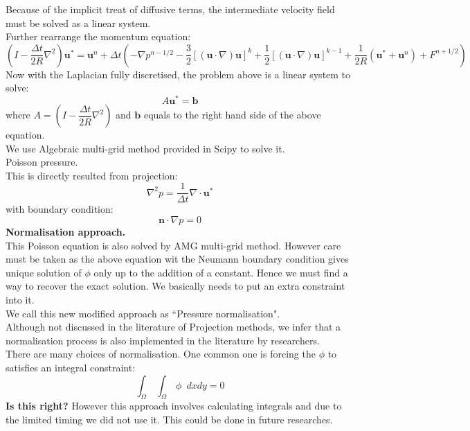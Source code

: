 Because of the implicit treat of diffusive terms, the intermediate velocity field must be solved as a linear system.\\
Further rearrange the momentum equation:
\begin{equation}
\left(I - \dfrac{\Delta t}{2R}\nabla^2\right)\textbf{u}^* = \textbf{u}^n + \Delta t\left(-\nabla p^{n-1/2} -\dfrac{3}{2}\left[(\textbf{u}\cdot\nabla)\textbf{u}\right]^k + \dfrac{1}{2}\left[(\textbf{u}\cdot\nabla)\textbf{u}\right]^{k-1} + \dfrac{1}{2R}(\textbf{u}^*+\textbf{u}^n) + F^{n+1/2} \right)
\end{equation}
Now with the Laplacian fully discretised, the problem above is a linear system to solve:
\begin{equation}
A\textbf{u}^* = \textbf{b}
\end{equation}
where $A = \left(I - \dfrac{\Delta t}{2R}\nabla^2\right)$ and $\textbf{b}$ equals to the right hand side of the above equation.\\

We use Algebraic multi-grid method provided in Scipy to solve it.\\

Poisson pressure.\\
This is directly resulted from projection:
\begin{equation}
\nabla^2 p = \dfrac{1}{\Delta t}\nabla \cdot \textbf{u}^*
\end{equation}
with boundary condition:
\begin{equation}
\textbf{n} \cdot \nabla p = 0
\end{equation}
\textbf{Normalisation approach.}\\
This Poisson equation is also solved by AMG multi-grid method. However care must be taken as the above equation wit the Neumann boundary condition gives unique solution of $\phi$ only up to the addition of a constant. Hence we must find a way to recover the exact solution. We basically needs to put an extra constraint into it.\\

We call this new modified approach as ``Pressure normalisation".\\

Although not discussed in the literature of Projection methods, we infer that a normalisation process is also implemented in the literature by researchers.\\

There are many choices of normalisation. One common one is forcing the $\phi$ to satisfies an integral constraint:
\begin{equation}
\int_{\Omega}\,\int_{\Omega}\,\phi \,\,\, dx dy = 0
\end{equation}
\textbf{Is this right?}
However this approach involves calculating integrals and due to the limited timing we did not use it. This could be done in future researches.\\

